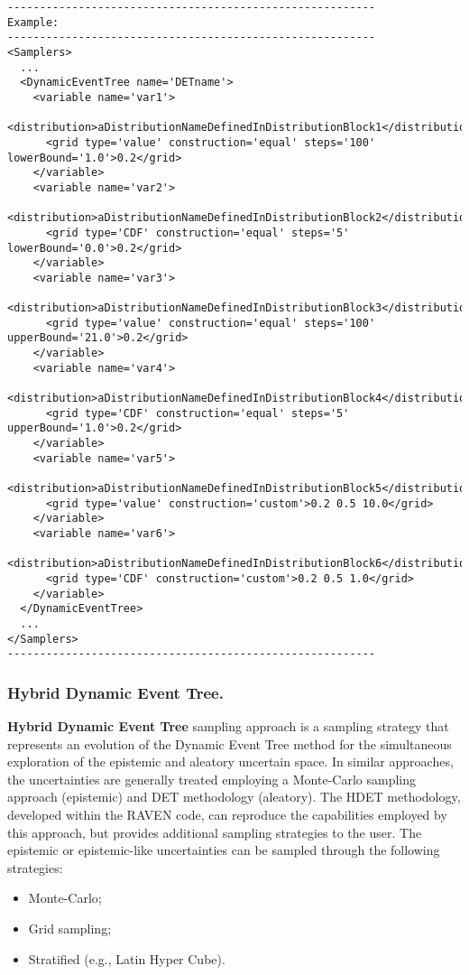 \begin{lstlisting}[style=XML]
---------------------------------------------------------
Example:
---------------------------------------------------------
<Samplers>
  ...
  <DynamicEventTree name='DETname'> 
    <variable name='var1'> 
      <distribution>aDistributionNameDefinedInDistributionBlock1</distribution> 
      <grid	type='value' construction='equal' steps='100' lowerBound='1.0'>0.2</grid>	
    </variable> 
    <variable name='var2'> 
      <distribution>aDistributionNameDefinedInDistributionBlock2</distribution> 
      <grid	type='CDF' construction='equal' steps='5' lowerBound='0.0'>0.2</grid>	
    </variable>
    <variable name='var3'> 
      <distribution>aDistributionNameDefinedInDistributionBlock3</distribution> 
      <grid	type='value' construction='equal' steps='100' upperBound='21.0'>0.2</grid>	
    </variable> 
    <variable name='var4'> 
      <distribution>aDistributionNameDefinedInDistributionBlock4</distribution> 
      <grid	type='CDF' construction='equal' steps='5' upperBound='1.0'>0.2</grid>	
    </variable>
    <variable name='var5'> 
      <distribution>aDistributionNameDefinedInDistributionBlock5</distribution> 
      <grid	type='value' construction='custom'>0.2 0.5 10.0</grid>	
    </variable> 
    <variable name='var6'> 
      <distribution>aDistributionNameDefinedInDistributionBlock6</distribution> 
      <grid	type='CDF' construction='custom'>0.2 0.5 1.0</grid>	
    </variable>
  </DynamicEventTree>
  ...
</Samplers>
---------------------------------------------------------
\end{lstlisting}

\subsubsection{Hybrid Dynamic Event Tree.}
\label{subsubsubsec:HDET}
\textbf{Hybrid Dynamic Event Tree} sampling approach is a sampling strategy that represents an evolution of the Dynamic Event Tree method for the simultaneous exploration of the epistemic and aleatory uncertain space. 
In similar approaches,  the uncertainties are generally treated employing a Monte-Carlo sampling approach (epistemic) and DET methodology (aleatory).  The HDET methodology, developed within the RAVEN code, can reproduce the capabilities employed by this approach, but provides additional sampling strategies to the user. The epistemic or epistemic-like uncertainties can be sampled through the following strategies:
\begin{itemize}
\item Monte-Carlo; 
\item Grid sampling;
\item Stratified (e.g., Latin Hyper Cube).
\end{itemize}

